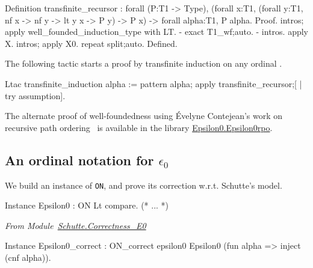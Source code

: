 
\begin{Coqsrc}

Definition transfinite_recursor :
 forall (P:T1 -> Type),
   (forall x:T1, 
     (forall y:T1, nf x -> nf y ->  lt y  x -> P y) -> P x) ->
    forall alpha:T1, P alpha.
Proof.
 intros; apply well_founded_induction_type with LT.
 -  exact T1_wf;auto.
 - intros. apply X. intros; apply X0. repeat split;auto. 
Defined.
\end{Coqsrc}

The following tactic starts a proof by  transfinite induction on any ordinal .

\begin{Coqsrc}
Ltac transfinite_induction alpha :=
  pattern alpha; apply transfinite_recursor;[ | try assumption].
\end{Coqsrc}


\begin{remark}
\label{remark:a3pat}
The alternate proof of well-foundedness using \'Evelyne Contejean's work on
    recursive path ordering~\cite{DershowitzRPO, a3pat} is available in the
    library \href{../theories/html/hydras.Epsilon0.Epsilon0rpo.html}{Epsilon0.Epsilon0rpo}.
 \end{remark}


\subsection{An ordinal notation for  \texorpdfstring{$\epsilon_0$}{epsilon0}}

We build an instance of \texttt{ON}, and prove its correction w.r.t. Schutte's model.

\label{instance-epsilon0}
\begin{Coqsrc}
Instance Epsilon0 : ON Lt compare.  
(* ... *)
\end{Coqsrc}


\emph{From Module~\href{../theories/html/hydras.Schutte.Correctness_E0.html}{Schutte.Correctness\_E0}}

\begin{Coqsrc}
Instance Epsilon0_correct :
  ON_correct epsilon0 Epsilon0 (fun alpha => inject (cnf alpha)).
\end{Coqsrc}

